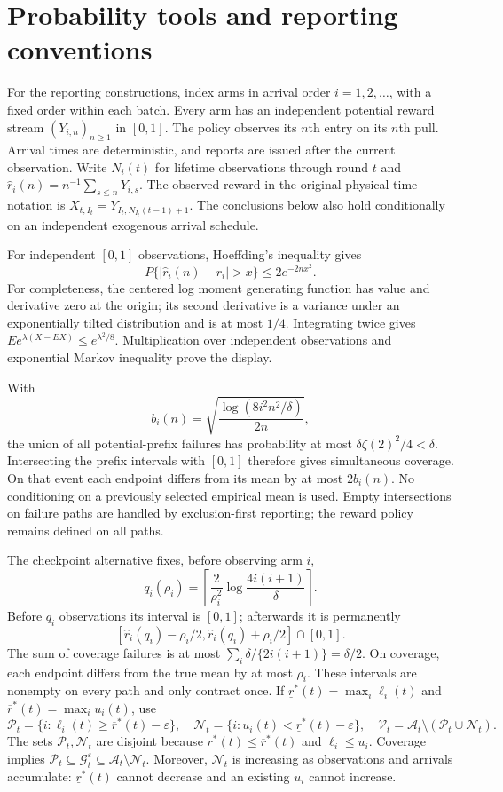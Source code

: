 \section{Probability tools and reporting conventions}
\label{app:tools}

For the reporting constructions, index arms in arrival order
$i=1,2,\ldots$, with a fixed order within each batch.
Every arm has an independent potential reward stream $(Y_{i,n})_{n\ge1}$
in $[0,1]$. The policy observes its $n$th entry on its $n$th pull. Arrival
times are deterministic, and reports are issued after the current observation.
Write $N_i(t)$ for lifetime observations through round $t$ and
$\hat r_i(n)=n^{-1}\sum_{s\le n}Y_{i,s}$. The observed reward in the
original physical-time notation is
$X_{t,I_t}=Y_{I_t,N_{I_t}(t-1)+1}$. The conclusions below also
hold conditionally on an independent exogenous arrival schedule.

For independent $[0,1]$ observations, Hoeffding's inequality gives
\[
 P\{|\hat r_i(n)-r_i|>x\}\le2e^{-2nx^2}.
\]
For completeness, the centered log moment generating function has value and
derivative zero at the origin; its second derivative is a variance under an
exponentially tilted distribution and is at most $1/4$. Integrating twice
gives $Ee^{\lambda(X-EX)}\le e^{\lambda^2/8}$. Multiplication over independent
observations and exponential Markov inequality prove the display.

With
\[
 b_i(n)=\sqrt{\frac{\log(8i^2n^2/\delta)}{2n}},
\]
the union of all potential-prefix failures has probability at most
$\delta\zeta(2)^2/4<\delta$. Intersecting the prefix intervals with $[0,1]$
therefore gives simultaneous coverage. On that event each endpoint differs
from its mean by at most $2b_i(n)$. No conditioning on a previously selected
empirical mean is used. Empty intersections on failure paths are handled by
exclusion-first reporting; the reward policy remains defined on all paths.

The checkpoint alternative fixes, before observing arm $i$,
\[
 q_i(\rho_i)=\left\lceil\frac2{\rho_i^2}
            \log\frac{4i(i+1)}\delta\right\rceil.
\]
Before $q_i$ observations its interval is $[0,1]$; afterwards it is permanently
\[
 [\hat r_i(q_i)-\rho_i/2,
  \hat r_i(q_i)+\rho_i/2]\cap[0,1].
\]
The sum of coverage failures is at most
$\sum_i\delta/\{2i(i+1)\}=\delta/2$. On coverage, each endpoint differs from
the true mean by at most $\rho_i$. These intervals are nonempty on every path
and only contract once. If $\underline r^*(t)=\max_i\ell_i(t)$ and
$\overline r^*(t)=\max_i u_i(t)$, use
\[
 \mathcal P_t=\{i:\ell_i(t)\ge\overline r^*(t)-\varepsilon\},\quad
 \mathcal N_t=\{i:u_i(t)<\underline r^*(t)-\varepsilon\},\quad
 \mathcal V_t=\mathcal{A}_t\setminus(\mathcal P_t\cup \mathcal N_t).
\]
The sets $\mathcal P_t,\mathcal N_t$ are disjoint because
$\underline r^*(t)\le\overline r^*(t)$ and $\ell_i\le u_i$.
Coverage implies
$\mathcal P_t\subseteq \mathcal G_t^\varepsilon\subseteq \mathcal{A}_t\setminus \mathcal N_t$.
Moreover, $\mathcal N_t$ is increasing as observations and arrivals accumulate:
$\underline r^*(t)$ cannot decrease and an existing $u_i$ cannot increase.

